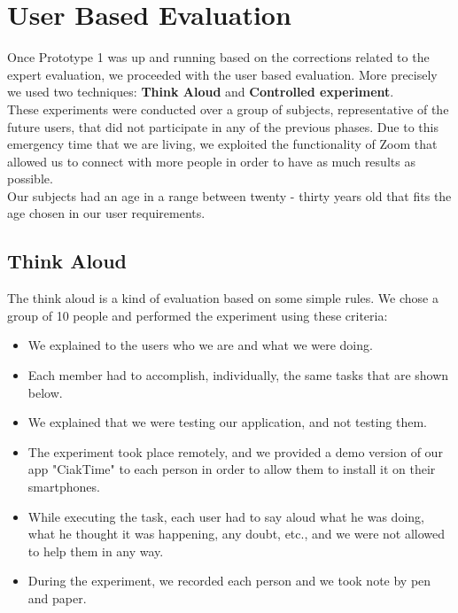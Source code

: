 \documentclass[12pt, a4paper]{article}
\numberwithin{figure}{section}
\begin{document}

\newpage

\section{User Based Evaluation}

Once Prototype 1 was up and running based on the corrections related to the expert evaluation, we
proceeded with the user based evaluation. More precisely we used two techniques: \textbf{Think Aloud} and
\textbf{Controlled experiment}.\\ These experiments were conducted over a group of subjects, representative
of the future users, that did not participate in any of the previous phases.
Due to this emergency time that we are living, we exploited the functionality of Zoom that allowed us
to connect with more people in order to have as much results as possible.\\
Our subjects had an age in a range between twenty - thirty years old that fits the age chosen in our user requirements.

\subsection{Think Aloud}

The think aloud is a kind of evaluation based on some simple rules. We chose a group of 10 people and
performed the experiment using these criteria:
\begin{itemize}
	\item We explained to the users who we are and what we were doing.
	\item Each member had to accomplish, individually, the same tasks that are shown below.
	\item We explained that we were testing our application, and not testing them.
	\item The experiment took place remotely, and we provided a demo version of our app "CiakTime" to each person in order to allow them to install it on their smartphones.
	\item While executing the task, each user had to say aloud what he was doing, what he thought it was happening, any doubt, etc., and we were not allowed to help them in any way.
	\item During the experiment, we recorded each person and we took note by pen and paper.
\end{itemize}
\end{document}
